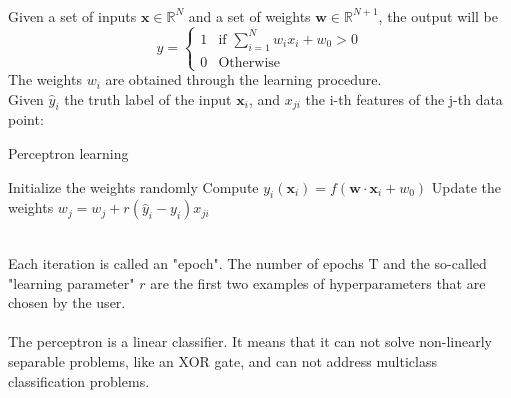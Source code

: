 \\
Given a set of inputs $\bm{x} \in \mathbb{R}^N$ and a set of weights $\bm{w} \in \mathbb{R}^{N+1}$, the output will be
\begin{equation}
    y=
    \begin{cases}
        1 & \text{if }\sum_{i=1}^N w_i x_i + w_0 >0\\
        0 & \text{Otherwise}
    \end{cases}
\end{equation}
The weights $w_i$ are obtained through the learning procedure.\\
Given $\hat{y}_i$ the truth label of the input $\bm{x}_i$, and $x_{ji}$ the i-th features of the j-th data point:\\
\begin{algorithm}
\caption{Perceptron learning}\label{algo:perceptron}
\begin{algorithmic}[1]
    \State Initialize the weights randomly
            \State Compute $y_i(\bm{x}_i)=f(\bm{w}\cdot \bm{x}_i+w_0)$
            \State Update the weights $w_j=w_j+r(\hat{y}_i-y_i)x_{ji}$
        \EndFor
    \EndFor
\end{algorithmic}
\end{algorithm}
\\
Each iteration is called an "epoch". The number of epochs T and the so-called "learning parameter" $r$ are the first two examples of hyperparameters that are chosen by the user.\\
\\
The perceptron is a linear classifier. It means that it can not solve non-linearly separable problems, like an XOR gate, and can not address multiclass classification problems.



